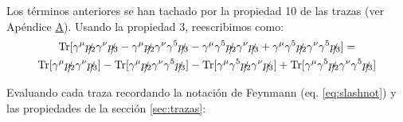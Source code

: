 Los términos anteriores se han tachado por la propiedad 10 de las trazas (ver Apéndice \hyperref[cap:A]{A}). Usando la propiedad 3, reescribimos como:
\begin{multline}
\operatorname{Tr}[ \gamma ^{\mu }\slashed{p_{2}}\gamma ^{\nu }\slashed{p_{3}} -\gamma ^{\mu }\slashed{p_{2}}\gamma ^{\nu }\gamma ^{5}\slashed{p_{3}} -\gamma ^{\mu }\gamma ^{5}\slashed{p_{2}}\gamma ^{\nu }\slashed{p_{3}} +\gamma ^{\mu }\gamma ^{5}\slashed{p_{2}}\gamma ^{\nu }\gamma ^{5}\slashed{p_{3}}] = \\ \operatorname{Tr}[ \gamma ^{\mu }\slashed{p_{2}}\gamma ^{\nu }\slashed{p_{3}}] - \operatorname{Tr}[\gamma ^{\mu }\slashed{p_{2}}\gamma ^{\nu }\gamma ^{5}\slashed{p_{3}}] - \operatorname{Tr}[\gamma ^{\mu }\gamma ^{5}\slashed{p_{2}}\gamma ^{\nu }\slashed{p_{3}}] + \operatorname{Tr}[\gamma ^{\mu }\gamma ^{5}\slashed{p_{2}}\gamma ^{\nu }\gamma ^{5}\slashed{p_{3}}]
\end{multline}

Evaluando cada traza recordando la notación de Feynmann (eq. \ref{eq:slashnot}) y las propiedades de la sección \ref{sec:trazas}:

